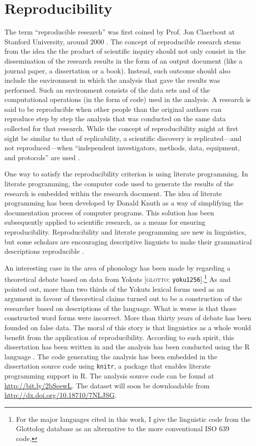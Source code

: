 \documentclass[11pt,a4paper,oneside,openany]{memoir}\usepackage[]{graphicx}\usepackage[]{color}
\begin{document}
\section{Reproducibility}
The term ``reproducible research'' was first coined by Prof. Jon Claerbout at Stanford University, around 2000 \citep{fomel2009}.
The concept of reproducible research stems from the idea the the product of scientific inquiry should not only consist in the dissemination of the research results in the form of an output document (like a journal paper, a dissertation or a book).
Instead, such outcome should also include the environment in which the analysis that gave the results was performed.
Such an environment consists of the data sets and of the computational operations (in the form of code) used in the analysis.
A research is said to be reproducible when other people than the original authors can reproduce step by step the analysis that was conducted on the same data collected for that research.
While the concept of reproducibility might at first sight be similar to that of replicability, a scientific discovery is replicated---and not reproduced---when ``independent investigators, methods, data, equipment, and protocols'' are used \citep{peng2009}.

One way to satisfy the reproducibility criterion is using literate programming.
In literate programming, the computer code used to generate the results of the research is embedded within the research document.
The idea of literate programming has been developed by Donald Knuth \citep{knuth1984} as a way of simplifying the documentation process of computer programs.
This solution has been subsequently applied to scientific research, as a means for ensuring reproducibility.
Reproducibility and literate programming are new in linguistics, but some scholars are encouraging descriptive linguists to make their grammatical descriptions reproducible \citep{maxwell2005,maxwell2013}.

An interesting case in the area of phonology has been made by \citet{maxwell2013} regarding a theoretical debate based on data from Yokuts [\textsc{glotto}: \texttt{yoku1256}].\footnote{For the major languages cited in this work, I give the linguistic code from the Glottolog database \citep{hammarstrom2016} as an alternative to the more conventional ISO 639 code.}
As \citet{weigel2002} and \citet{blevins2004a} pointed out, more than two thirds of the Yokuts lexical forms used as an argument in favour of theoretical claims turned out to be a construction of the researcher based on descriptions of the language.
What is worse is that those constructed word forms were incorrect.
More than thirty years of debate has been founded on false data.
The moral of this story is that linguistics as a whole would benefit from the application of reproducibility.
According to such spirit, this dissertation has been written in \XeLaTeX{} and the analysis has been conducted using the R language \citep{r-core-team2015}. 
The code generating the analysis has been embedded in the dissertation source code using \texttt{knitr}, a package that enables literate programming support in R.
The analysis source code can be found at \url{http://bit.ly/2bSeewL}.
The dataset will soon be downloadable from \url{http://dx.doi.org/10.18710/7NLJSG}.
\end{document}
